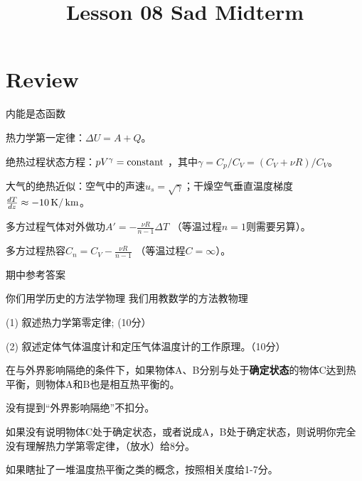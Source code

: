 \documentclass[CJK]{beamer}
\title{Lesson 08 Sad Midterm}
\author{}
\date{}
\begin{document}

\section{Review}

\begin{frame}
\bch
\bitem
\item{内能是态函数}
\item{热力学第一定律：$\Delta U = A + Q$。}
\item{绝热过程状态方程：$pV^\gamma = \mathrm{constant}$ ，其中$\gamma = C_p/C_V = (C_V + \nu R)/C_V$。}
\item{大气的绝热近似：空气中的声速$u_s =\sqrt{\gamma}$；干燥空气垂直温度梯度$\frac{dT}{dz} \approx -10 \,\mathrm{K}/\,\mathrm{km}$。}
\item{多方过程气体对外做功$A' = -\frac{\nu R}{n-1}\Delta T$ （等温过程$n=1$则需要另算）。}
\item{多方过程热容$C_n =C_V -\frac{\nu R}{n-1}$ （等温过程$C = \infty$）。}
\eitem
\ech
\end{frame}


\begin{frame}
\bch
\bitem
\item{期中参考答案}
\eitem
\ech
\end{frame}


\begin{frame}
\bch
{}
\ech
\end{frame}


\begin{frame}
\bch
{}
你们用学历史的方法学物理
\emini
{}
\emini
{}
我们用教数学的方法教物理
\emini
\ech
\end{frame}

\begin{frame}
\bch
{\blue 
\bitem
\item[(1)]{\blue 叙述热力学第零定律; (10分）}
\item[(2)]{\blue 叙述定体气体温度计和定压气体温度计的工作原理。（10分）}
\eitem
}
\ech
\end{frame}

\begin{frame}
\bch

{\darkgreen 
在与外界影响隔绝的条件下，如果物体A、B分别与处于{\bf 确定状态}的物体C达到热平衡，则物体A和B也是相互热平衡的。
}

{\small
\bitem
\item{没有提到“外界影响隔绝”不扣分。}
\item{如果没有说明物体C处于确定状态，或者说成A，B处于确定状态，则说明你完全没有理解热力学第零定律，（放水）给8分。}
\item{如果瞎扯了一堆温度热平衡之类的概念，按照相关度给1-7分。}
\eitem
}
\ech
\end{frame}
\end{document}
